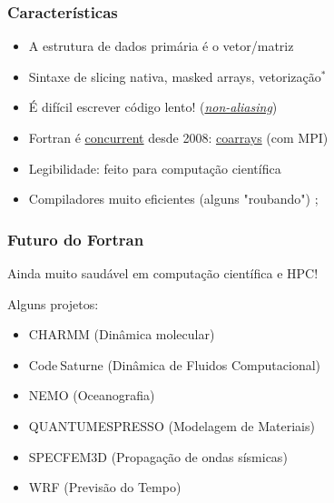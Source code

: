 \documentclass{beamer}
\begin{document}
\begin{darkframes}
  \begin{frame}[label=features]
    \frametitle{Características}
    \begin{itemize}
    \item A estrutura de dados primária é o vetor/matriz
    \item Sintaxe de slicing nativa, masked arrays, vetorização$^*$
    \item É difícil escrever código lento! (\hyperlink{aliasing}{\emph{non-aliasing}})
    \item Fortran é \href{https://en.wikipedia.org/wiki/Concurrent_computing}{concurrent} desde 2008: \href{https://en.wikipedia.org/wiki/Coarray_Fortran}{coarrays} (com MPI)
    \item Legibilidade: feito para computação científica
    \item Compiladores muito eficientes (alguns "roubando") \hyperlink{compilers}{}; 
    \end{itemize}
  \end{frame}
  
  \begin{frame}
    \frametitle{Futuro do Fortran}
    Ainda muito saudável em computação científica e HPC!

    \vfill
    Alguns projetos:
    \begin{itemize}
    \item CHARMM (Dinâmica molecular)
    \item Code$_{\ }$Saturne (Dinâmica de Fluidos Computacional)
    \item NEMO (Oceanografia)
    \item QUANTUMESPRESSO (Modelagem de Materiais)
    \item SPECFEM3D (Propagação de ondas sísmicas)
    \item WRF (Previsão do Tempo)
    \end{itemize}
  \end{frame}
  

\end{darkframes}
\end{document}
